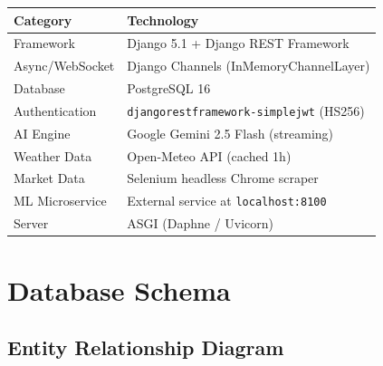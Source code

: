 \documentclass[11pt,a4paper]{article}
\begin{document}
\begin{table}[H]
\centering
\begin{tabular}{l l}
\toprule
\textbf{Category} & \textbf{Technology} \\
\midrule
Framework       & Django 5.1 + Django REST Framework \\
Async/WebSocket & Django Channels (InMemoryChannelLayer) \\
Database        & PostgreSQL 16 \\
Authentication  & \texttt{djangorestframework-simplejwt} (HS256) \\
AI Engine       & Google Gemini 2.5 Flash (streaming) \\
Weather Data    & Open-Meteo API (cached 1h) \\
Market Data     & Selenium headless Chrome scraper \\
ML Microservice & External service at \texttt{localhost:8100} \\
Server          & ASGI (Daphne / Uvicorn) \\
\bottomrule
\end{tabular}
\end{table}

\newpage
\section{Database Schema}

\subsection{Entity Relationship Diagram}
\end{document}
